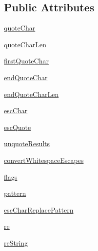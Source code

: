 \subsection*{Public Attributes}
\begin{DoxyCompactItemize}
\item 
\hyperlink{classpkg__resources_1_1__vendor_1_1pyparsing_1_1QuotedString_a9fd21377820ca6289c84123a1b22b08e}{quote\+Char}
\item 
\hyperlink{classpkg__resources_1_1__vendor_1_1pyparsing_1_1QuotedString_a4b67ac5130d7b3f2201745376821af11}{quote\+Char\+Len}
\item 
\hyperlink{classpkg__resources_1_1__vendor_1_1pyparsing_1_1QuotedString_a7191872a41866753c4a530e32da38728}{first\+Quote\+Char}
\item 
\hyperlink{classpkg__resources_1_1__vendor_1_1pyparsing_1_1QuotedString_ae3b9ebc7f9a97d031ada29b6f3264771}{end\+Quote\+Char}
\item 
\hyperlink{classpkg__resources_1_1__vendor_1_1pyparsing_1_1QuotedString_a5f5c31d105a55bd9560d8c274afd3950}{end\+Quote\+Char\+Len}
\item 
\hyperlink{classpkg__resources_1_1__vendor_1_1pyparsing_1_1QuotedString_acb6bd36e2339b38d9808246c4d58de5b}{esc\+Char}
\item 
\hyperlink{classpkg__resources_1_1__vendor_1_1pyparsing_1_1QuotedString_a8933bcacb2af5f1ea0975f699ee742b2}{esc\+Quote}
\item 
\hyperlink{classpkg__resources_1_1__vendor_1_1pyparsing_1_1QuotedString_ad74814bda4fde89c31beb5bdffae0907}{unquote\+Results}
\item 
\hyperlink{classpkg__resources_1_1__vendor_1_1pyparsing_1_1QuotedString_a4b906c2e698a2cd5854b8d0829467f1b}{convert\+Whitespace\+Escapes}
\item 
\hyperlink{classpkg__resources_1_1__vendor_1_1pyparsing_1_1QuotedString_a3009465faadacb328202692fa2e64168}{flags}
\item 
\hyperlink{classpkg__resources_1_1__vendor_1_1pyparsing_1_1QuotedString_a9ed31633d1f2200afc9bec7b44244dca}{pattern}
\item 
\hyperlink{classpkg__resources_1_1__vendor_1_1pyparsing_1_1QuotedString_a3c243dd80d21d6d2e96e9151247e3aea}{esc\+Char\+Replace\+Pattern}
\item 
\hyperlink{classpkg__resources_1_1__vendor_1_1pyparsing_1_1QuotedString_a24645ab3e490d31ae5dbb2dbd7c4c9a1}{re}
\item 
\hyperlink{classpkg__resources_1_1__vendor_1_1pyparsing_1_1QuotedString_ab6d41ca5d7c93651345848e131ad41a3}{re\+String}

\end{DoxyCompactItemize}
